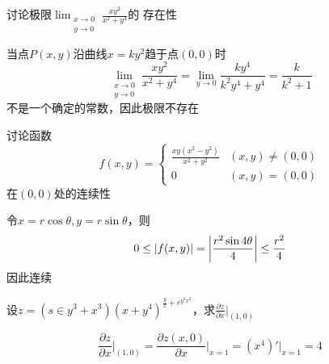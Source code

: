 \documentclass{article}
\begin{document}
\begin{examplle}[]
讨论极限\(\displaystyle\lim_{\substack{x\to0\\y\to0}}\frac{xy^2}{x^2+y^4}\)的
存在性

当点\(P(x,y)\)沿曲线\(x=ky^2\)趋于点\((0,0)\)时
\begin{equation*}
\lim_{\substack{x\to0\\y\to0}}\frac{xy^2}{x^2+y^4}=
\lim_{y\to0}\frac{ky^4}{k^2y^4+y^4}=\frac{k}{k^2+1}
\end{equation*}
不是一个确定的常数，因此极限不存在
\end{examplle}

\begin{examplle}[]
讨论函数
\begin{equation*}
f(x,y)=
\begin{cases}
\frac{xy(x^2-y^2)}{x^2+y^2}&(x,y)\neq(0,0)\\
0&(x,y)=(0,0)
\end{cases}
\end{equation*}在\((0,0)\)处的连续性

令\(x=r\cos\theta,y=r\sin\theta\)，则
\begin{equation*}
0\le\abs{f(x,y)}=\abs{\frac{r^2\sin 4\theta}{4}}\le\frac{r^2}{4}
\end{equation*}
因此连续
\end{examplle}

\begin{examplle}[]
设\(z=(s\in y^3+x^3)(x+y^4)^{\frac{y}{x}+e^{y^3x^2}}\)，求\(\frac{\partial z}{\partial
   x}\Big\rvert_{(1,0)}\)

\begin{equation*}
\frac{\partial z}{\partial x}\Big\rvert_{(1,0)}=\frac{\partial z(x,0)}{\partial x}\Big\rvert_{x=1}=(x^4)'
\Big\rvert_{x=1}=4
\end{equation*}
\end{examplle}
\end{document}
